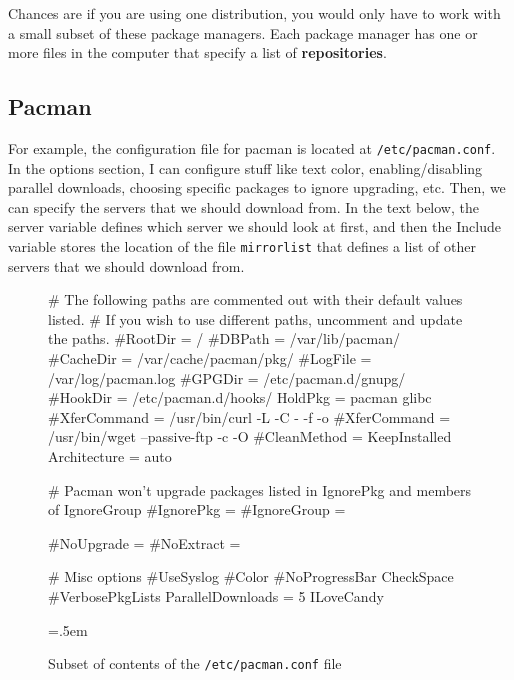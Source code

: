 \documentclass{article}
\theoremstyle{definition}
\newenvironment{cverbatim}
    {\SaveVerbatim{cverb}}
    {\endSaveVerbatim
    \flushleft\fboxrule=0pt\fboxsep=.5em
    \colorbox{cverbbg}{%
      \makebox[\dimexpr\linewidth-2\fboxsep][l]{\BUseVerbatim{cverb}}%
    }
    \endflushleft
  }
\begin{document}
  Chances are if you are using one distribution, you would only have to work with a small subset of these package managers. Each package manager has one or more files in the computer that specify a list of \textbf{repositories}. 

  \subsection{Pacman}

    For example, the configuration file for pacman is located at \texttt{/etc/pacman.conf}. In the options section, I can configure stuff like text color, enabling/disabling parallel downloads, choosing specific packages to ignore upgrading, etc. Then, we can specify the servers that we should download from. In the text below, the server variable defines which server we should look at first, and then the Include variable stores the location of the file \texttt{mirrorlist} that defines a list of other servers that we should download from. 
    
    \begin{figure}
      \begin{cverbatim} 
        # The following paths are commented out with their default values listed.
        # If you wish to use different paths, uncomment and update the paths.
        #RootDir     = /
        #DBPath      = /var/lib/pacman/
        #CacheDir    = /var/cache/pacman/pkg/
        #LogFile     = /var/log/pacman.log
        #GPGDir      = /etc/pacman.d/gnupg/
        #HookDir     = /etc/pacman.d/hooks/
        HoldPkg     = pacman glibc
        #XferCommand = /usr/bin/curl -L -C - -f -o %
        #XferCommand = /usr/bin/wget --passive-ftp -c -O %
        #CleanMethod = KeepInstalled
        Architecture = auto

        # Pacman won't upgrade packages listed in IgnorePkg and members of IgnoreGroup
        #IgnorePkg   =
        #IgnoreGroup =

        #NoUpgrade   =
        #NoExtract   =

        # Misc options
        #UseSyslog
        #Color
        #NoProgressBar
        CheckSpace
        #VerbosePkgLists
        ParallelDownloads = 5
        ILoveCandy

      \end{cverbatim}
      \caption{Subset of contents of the \texttt{/etc/pacman.conf} file} \label{fig:pacman.conf}
    \end{figure}
    
\end{document}

